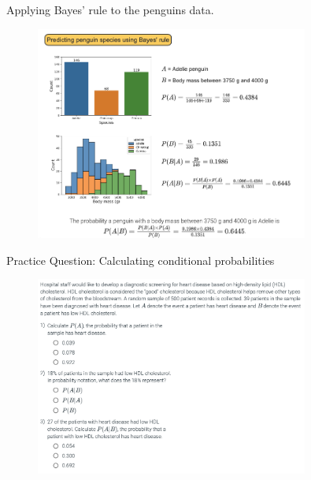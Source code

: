 \documentclass[10pt,dvipsnames]{beamer}
\begin{document}
\begin{frame}{Applying Bayes' rule to the penguins data.}
    \begin{figure}[ht]
        \centering
        \includegraphics[width=0.8\textwidth]{imgs/nb_5.png}
    \end{figure}
\end{frame}

\begin{frame}{Practice Question: Calculating conditional probabilities}
    \begin{figure}[ht]
        \centering
        \includegraphics[width=0.8\textwidth]{imgs/nb_6.png}
    \end{figure}
\end{frame}
\end{document}
